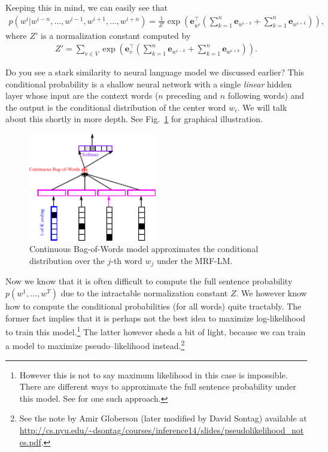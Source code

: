 \documentclass{report}
\newcommand{\vect}[1]{\mathbf{#1}}
\newcommand{\ve}[0]{\vect{e}}
\begin{document}
Keeping this in mind, we can easily see that
\begin{align*}
    p(w^i|w^{i-n}, \ldots, w^{i-1}, w^{i+1}, \ldots, w^{i+n})
    = \frac{1}{Z'} \exp\left(\ve_{w^i}^\top \left( 
            \sum_{k=1}^n 
            \ve_{w^{i-k}}
            +
            \sum_{k=1}^n 
            \ve_{w^{i+k}}
    \right)\right),
\end{align*}
where $Z'$ is a normalization constant computed by
\begin{align*}
    Z' = \sum_{v \in V} \exp\left( \ve_v^\top \left( 
            \sum_{k=1}^n 
            \ve_{w^{i-k}}
            +
            \sum_{k=1}^n 
            \ve_{w^{i+k}}
    \right)\right).
\end{align*}

Do you see a stark similarity to neural language model we discussed earlier?
This conditional probability is a shallow neural network with a single {\em
linear} hidden layer whose input are the context words ($n$ preceding and $n$
following words) and the output is the conditional distribution of the center
word $w_i$. We will talk about this shortly in more depth. See
Fig.~\ref{fig:cbow} for graphical illustration.

\begin{figure}[ht]
    \centering
    \includegraphics[width=0.5\textwidth]{figures/cbow.pdf}
    \caption{Continuous Bag-of-Words model approximates the conditional
    distribution over the $j$-th word $w_j$ under the MRF-LM.}
    \label{fig:cbow}
\end{figure}

Now we know that it is often difficult to compute the full sentence probability
$p(w^1, \ldots, w^T)$ due to the intractable normalization constant $Z$. We
however know how to compute the conditional probabilities (for all words) quite
tractably. The former fact implies that it is perhaps not the best idea to
maximize log-likelihood to train this model.\footnote{
    However this is not to say maximum likelihood in this case is impossible.
    There are different ways to approximate the full sentence probability under
    this model. See \cite{jernite2015fast} for one such approach.
} The latter however sheds a bit of light, because we can train a model to
maximize pseudo--likelihood \cite{besag1975statistical} instead.\footnote{
    See the note by Amir Globerson (later modified by David Sontag) available at
    \url{http://cs.nyu.edu/~dsontag/courses/inference14/slides/pseudolikelihood_notes.pdf}.
}
\end{document}
